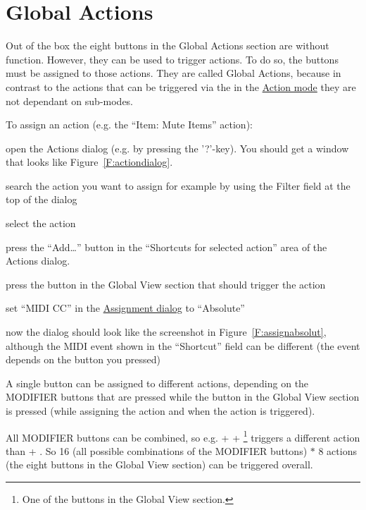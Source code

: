 \section{Global Actions}\label{globalactions}
Out of the box the eight buttons in the Global Actions section are
without function. However, they can be used to trigger \reaper
actions. To do so, the buttons must be assigned to those actions. They
are called Global Actions, because in contrast to the actions that can
be triggered via the \vpots in the \hyperref[actionmode]{Action mode}
they are not dependant on sub-modes.


\noindent
To assign an action (e.g. the ``Item: Mute Items'' action):
\begin{compactitem}
\item open the Actions dialog (e.g. by pressing the '?'-key). You
should get a window that looks like Figure~\ref{F:actiondialog}.
\item search the action you want to assign for example by using the Filter field at
the top of the dialog
\item select the action 
\item press the ``Add\ldots'' button in the ``Shortcuts for selected
  action'' area of the Actions dialog. 
\item press the button in the Global View section that should trigger
  the action
\item set ``MIDI CC'' in the \hyperref[F:assignabsolut]{Assignment dialog} to
``Absolute''
\item now the dialog should look like the screenshot in
  Figure~\ref{F:assignabsolut}, although the MIDI event shown in the
  ``Shortcut'' field can be different (the event depends on the
  button you pressed) \end{compactitem} \vspace{-3mm}


\clearpage
{}
A single button can be assigned to different actions, depending on the MODIFIER
buttons that are pressed while the button in the Global View section is pressed
(while assigning the action and when the action is triggered). 


All MODIFIER
buttons can be combined, so e.g. \shift + \alt + \footnote{One of the buttons in the
Global View section.} triggers a different action than \shift + . So
16 (all possible combinations of the MODIFIER buttons) $\ast$ 8 actions
(the eight buttons in the Global View section) can be triggered overall.

